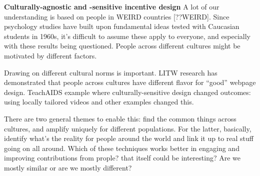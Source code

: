 \textbf{Culturally-agnostic and -sensitive incentive design}
A lot of our understanding is based on people in WEIRD countries [??WEIRD]. Since psychology studies have built upon fundamental ideas tested with Caucasian students in 1960s, it’s difficult to assume these apply to everyone, and especially with these results being questioned. People across different cultures might be motivated by different factors. 

Drawing on different cultural norms is important. LITW research has demonstrated that people across cultures have different flavor for “good” webpage design. TeachAIDS example where culturally-sensitive design changed outcomes: using locally tailored videos and other examples changed this.

There are two general themes to enable this: find the common things across cultures, and amplify uniquely for different populations. For the latter, basically, identify what’s the reality for people around the world and link it up to real stuff going on all around. Which of these techniques works better in engaging and improving contributions from prople? that itself could be interesting? Are we mostly similar or are we mostly different?

